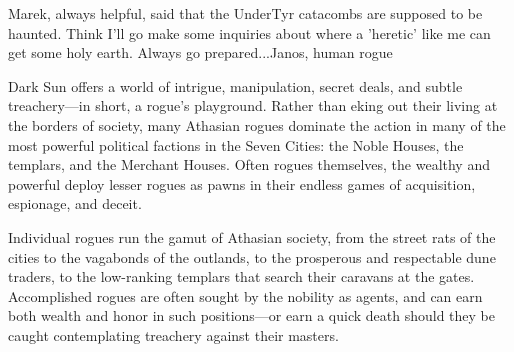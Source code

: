 {Marek, always helpful, said that the UnderTyr catacombs are supposed to be haunted. Think I'll go make some inquiries about where a 'heretic' like me can get some holy earth. Always go prepared...}{Janos, human rogue}

{\tableheader Dark Sun} offers a world of intrigue, manipulation, secret deals, and subtle treachery---in short, a rogue's playground. Rather than eking out their living at the
borders of society, many Athasian rogues dominate the action in many of the most powerful political factions in the Seven Cities: the Noble Houses, the templars, and the Merchant Houses. Often rogues themselves, the wealthy and powerful deploy lesser rogues as pawns in their endless games of acquisition, espionage, and deceit.

Individual rogues run the gamut of Athasian society, from the street rats of the cities to the vagabonds of the outlands, to the prosperous and respectable dune traders, to the low-ranking templars that search their caravans at the gates. Accomplished rogues are often sought by the nobility as agents, and can earn both wealth and honor in such positions---or earn a quick death should they be caught contemplating treachery against their masters.

